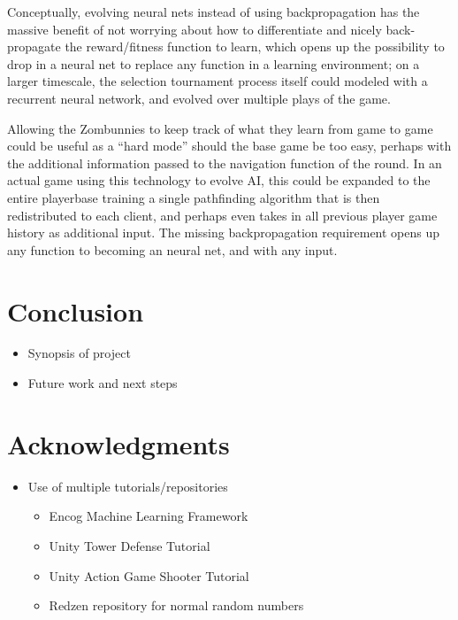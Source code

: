 \documentclass[letterpaper]{article}
\begin{document}
Conceptually, evolving neural nets instead of using backpropagation
has the massive benefit of not worrying about how to differentiate and nicely
back-propagate the reward/fitness function to learn, which opens up the
possibility to drop in a neural net to replace any function in a learning
environment; on a larger timescale, the selection tournament process itself
could modeled with a recurrent neural network, and evolved over multiple plays
of the game.

Allowing the Zombunnies to keep track of what they learn from game to game could
be useful as a ``hard mode'' should the base game be too easy, perhaps with the
additional information passed to the navigation function of the round. In an actual game
using this technology to evolve AI, this could be expanded to the entire
playerbase training a single pathfinding algorithm that is then redistributed to
each client, and perhaps even takes in all previous player game history as
additional input. The missing backpropagation requirement opens up
any function to becoming an neural net, and with any input.

\section{Conclusion}
\begin{itemize}
    \item Synopsis of project
    \item Future work and next steps
\end{itemize}

\section{Acknowledgments}
\begin{itemize}
    \item Use of multiple tutorials/repositories
    \begin{itemize}
        \item Encog Machine Learning Framework
        \item Unity Tower Defense Tutorial
        \item Unity Action Game Shooter Tutorial
        \item Redzen repository for normal random numbers
    \end{itemize}
\end{itemize}

\footnotesize

\end{document}
